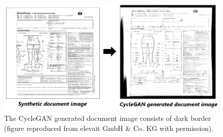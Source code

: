 \begin{figure}[H]
        \begin{center}
	    \includegraphics[scale=0.53]{images/Evaluation/failure3.png}
	    \caption[The \ac{CycleGAN} generated document image consists of dark border.]{The \ac{CycleGAN} generated document image consists of dark border (figure reproduced from elevait GmbH \& Co. KG with permission).}
	    \label{fig:failure3}
	    \end{center}
\end{figure}


